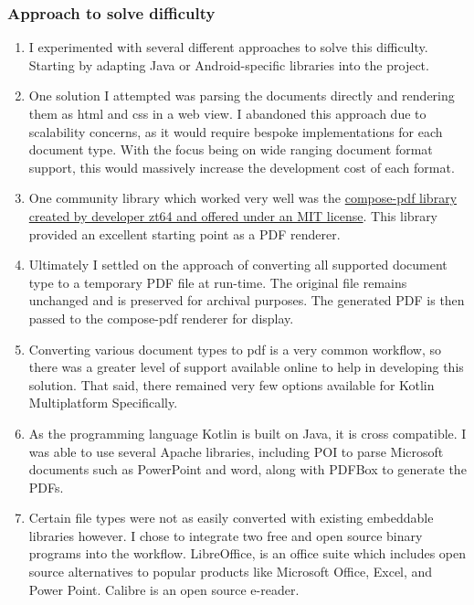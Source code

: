                 
        \subsubsection{Approach to solve difficulty}
            \begin{enumerate}
                \item I experimented with several different approaches to solve this difficulty. Starting by adapting Java or Android-specific libraries into the project.
                
                \item One solution I attempted was parsing the documents directly and rendering them as html and css in a web view. I abandoned this approach due to scalability concerns, as it would require bespoke implementations for each document type. With the focus being on wide ranging document format support, this would massively increase the development cost of each format. 
        
                \item One community library which worked very well was the  \hyperlink{https://github.com/zt64/compose-pdf/tree/main}{compose-pdf library created by developer zt64 and offered under an MIT license}. This library provided an excellent starting point as a PDF renderer. 
                
                \item Ultimately I settled on the approach of converting all supported document type to a temporary PDF file at run-time. The original file remains unchanged and is preserved for archival purposes. The generated PDF is then passed to the compose-pdf renderer for display.
        
                \item Converting various document types to pdf is a very common workflow, so there was a greater level of support available online to help in developing this solution. That said, there remained very few options available for Kotlin Multiplatform Specifically. 
        
                \item As the programming language Kotlin is built on Java, it is cross compatible. I was able to use several Apache libraries, including POI to parse Microsoft documents such as PowerPoint and word, along with  PDFBox to generate the PDFs. 
        
                \item Certain file types were not as easily converted with existing embeddable libraries however. I chose to integrate two free and open source binary programs into the workflow. LibreOffice, is an office suite which includes open source alternatives to popular products like Microsoft Office, Excel, and Power Point. Calibre is an open source e-reader. 
                

\end{enumerate}
